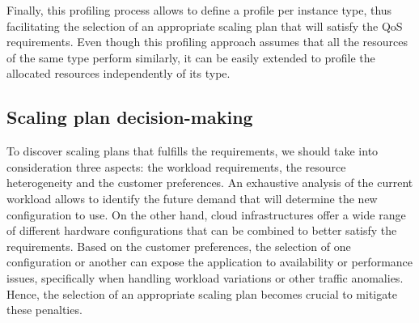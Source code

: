 \vspace{2mm}
Finally, this profiling process allows to define a profile per instance type, thus facilitating the selection of an appropriate scaling plan that will satisfy the QoS requirements. Even though this profiling approach assumes that all the resources of the same type perform similarly, it can be easily extended to profile the allocated resources independently of its type.




\subsection{Scaling plan decision-making}




To discover scaling plans that fulfills the requirements, we should take into consideration three aspects: the workload requirements, the resource heterogeneity and the customer preferences. An exhaustive analysis of the current workload allows to identify the future demand that will determine the new configuration to use. On the other hand, cloud infrastructures offer a wide range of different hardware configurations that can be combined to better satisfy the requirements. Based on the customer preferences, the selection of one configuration or another can expose the application to availability or performance issues, specifically when handling workload variations or other traffic anomalies. Hence, the selection of an appropriate scaling plan becomes crucial to mitigate these penalties. 




